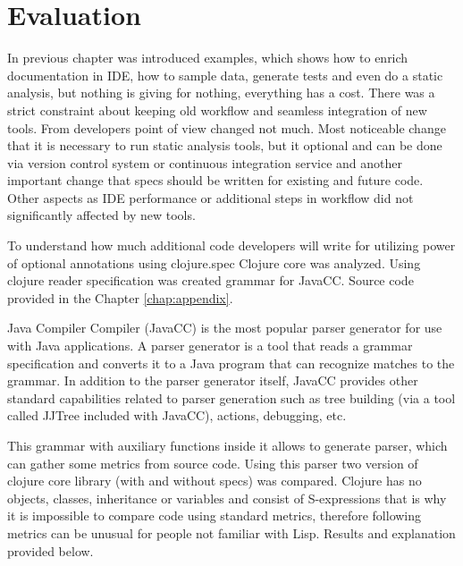 \chapter{Evaluation}

\label{chap:evaluation}

In previous chapter was introduced examples, which shows how to enrich
documentation in IDE, how to sample data, generate tests and even do a static
analysis, but nothing is giving for nothing, everything has a cost. There was a
strict constraint about keeping old workflow and seamless integration of new
tools. From developers point of view changed not much. Most noticeable change
that it is necessary to run static analysis tools, but it optional and can be
done via version control system or continuous integration service and another
important change that specs should be written for existing and future code.
Other aspects as IDE performance or additional steps in workflow did not
significantly affected by new tools.

To understand how much additional code developers will write for utilizing power
of optional annotations using clojure.spec Clojure core was analyzed. Using
clojure reader specification \cite{readerspec} was created grammar for JavaCC.
Source code provided in the Chapter \ref{chap:appendix}.


Java Compiler Compiler (JavaCC) is the most popular parser generator for use
with Java applications. A parser generator is a tool that reads a grammar
specification and converts it to a Java program that can recognize matches to
the grammar. In addition to the parser generator itself, JavaCC provides other
standard capabilities related to parser generation such as tree building (via a
tool called JJTree included with JavaCC), actions, debugging, etc.

This grammar with auxiliary functions inside it allows to generate parser, which
can gather some metrics from source code. Using this parser two version of
clojure core library (with and without specs) was compared. Clojure has no
objects, classes, inheritance or variables and consist of S-expressions that is
why it is impossible to compare code using standard metrics, therefore following
metrics can be unusual for people not familiar with Lisp. Results and
explanation provided below.




